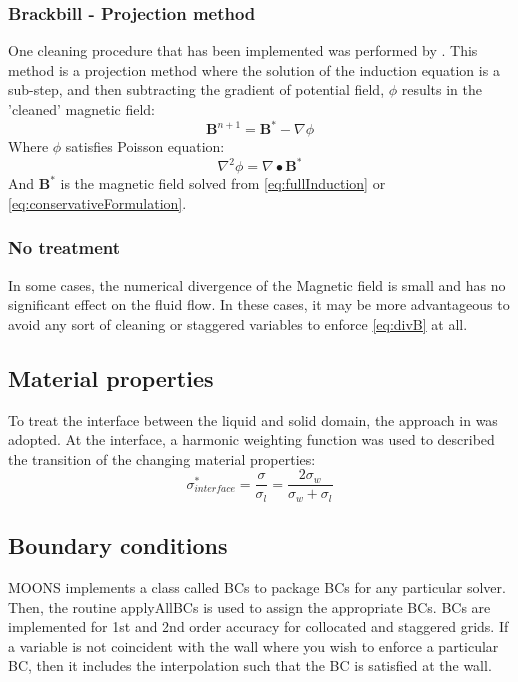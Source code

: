\subsubsection{Brackbill - Projection method}
One cleaning procedure that has been implemented was performed by \citep{Brackbill1980}. This method is a projection method where the solution of the induction equation is a sub-step, and then subtracting the gradient of potential field, $\phi$ results in the 'cleaned' magnetic field:
\begin{equation}  \label{eq:Projection}
\pmb{B}^{n+1} = \pmb{B}^* - \nabla \phi
\end{equation}
Where $\phi$ satisfies Poisson equation:
\begin{equation} 
\nabla^2 \phi = \nabla \bullet \pmb{B}^*
\end{equation}
And $\pmb{B}^*$ is the magnetic field solved from \ref{eq:fullInduction} or \ref{eq:conservativeFormulation}.

\subsubsection{No treatment}
In some cases, the numerical divergence of the Magnetic field is small and has no significant effect on the fluid flow. In these cases, it may be more advantageous to avoid any sort of cleaning or staggered variables to enforce \ref{eq:divB} at all.


\subsection{Material properties}
To treat the interface between the liquid and solid domain, the approach in \cite{Carvalho2013} was adopted. At the interface, a harmonic weighting function was used to described the transition of the changing material properties:
\begin{equation*}
\sigma^*_{interface} = \frac{\sigma}{\sigma_l} = \frac{2 \sigma_w}{\sigma_w + \sigma_l}
\end{equation*}


\subsection{Boundary conditions}
MOONS implements a class called BCs to package BCs for any particular solver. Then, the routine applyAllBCs is used to assign the appropriate BCs. BCs are implemented for 1st and 2nd order accuracy for collocated and staggered grids. If a variable is not coincident with the wall where you wish to enforce a particular BC, then it includes the interpolation such that the BC is satisfied at the wall. 

